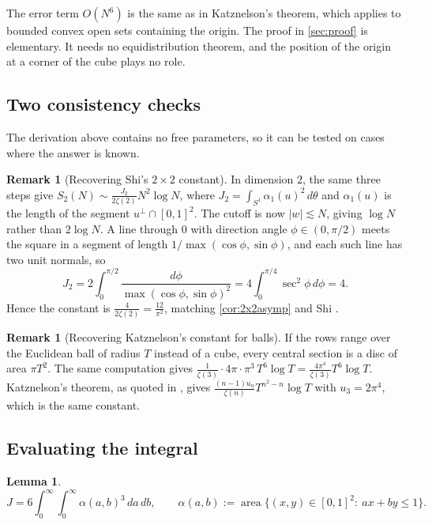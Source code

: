 \documentclass[11pt]{article}
\newtheorem{lemma}[theorem]{Lemma}
\theoremstyle{definition}
\newtheorem{remark}[theorem]{Remark}
\newcommand{\abs}[1]{\left\lvert #1 \right\rvert}
\begin{document}
The error term $O(N^6)$ is the same as in Katznelson's theorem, which applies to bounded convex open sets containing the origin. The proof in \cref{sec:proof} is elementary. It needs no equidistribution theorem, and the position of the origin at a corner of the cube plays no role.

\subsection{Two consistency checks}

The derivation above contains no free parameters, so it can be tested on cases where the answer is known.

\begin{remark}[Recovering Shi's $2\times2$ constant]\label{rem:check2}
In dimension $2$, the same three steps give $S_2(N)\sim\frac{J_2}{2\zeta(2)}N^2\log N$, where $J_2=\int_{S^1}\alpha_1(u)^2\,d\theta$ and $\alpha_1(u)$ is the length of the segment $u^\perp\cap[0,1]^2$. The cutoff is now $\abs{w}\lesssim N$, giving $\log N$ rather than $2\log N$. A line through $0$ with direction angle $\phi\in(0,\pi/2)$ meets the square in a segment of length $1/\max(\cos\phi,\sin\phi)$, and each such line has two unit normals, so
\[
J_2=2\int_0^{\pi/2}\frac{d\phi}{\max(\cos\phi,\sin\phi)^2}=4\int_0^{\pi/4}\sec^2\phi\,d\phi=4.
\]
Hence the constant is $\frac{4}{2\zeta(2)}=\frac{12}{\pi^2}$, matching \cref{cor:2x2asymp} and Shi \cite{Shi}.
\end{remark}

\begin{remark}[Recovering Katznelson's constant for balls]\label{rem:check3}
If the rows range over the Euclidean ball of radius $T$ instead of a cube, every central section is a disc of area $\pi T^2$. The same computation gives
$\frac{1}{\zeta(3)}\cdot 4\pi\cdot\pi^3\,T^6\log T=\frac{4\pi^4}{\zeta(3)}T^6\log T$. Katznelson's theorem, as quoted in \cite{Wigman}, gives $\frac{(n-1)u_n}{\zeta(n)}T^{n^2-n}\log T$ with $u_3=2\pi^4$, which is the same constant.
\end{remark}

\subsection{Evaluating the integral}

\begin{lemma}\label{lem:chart}
\[
J=6\int_0^\infty\!\!\int_0^\infty\alpha(a,b)^3\,da\,db,
\qquad
\alpha(a,b):=\operatorname{area}\bigl\{(x,y)\in[0,1]^2:\ ax+by\le1\bigr\}.
\]
\end{lemma}
\end{document}
